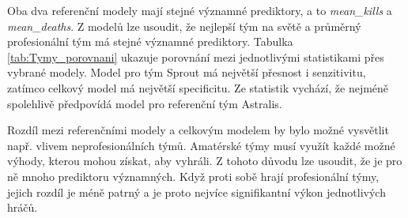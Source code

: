 

Oba dva referenční modely mají stejné významné prediktory, a to \textit{mean\_kills} a \textit{mean\_deaths}. Z modelů lze usoudit, že nejlepší tým na světě a průměrný profesionální
tým má stejné významné prediktory. Tabulka \ref{tab:Tymy_porovnani} ukazuje porovnání mezi jednotlivými statistikami přes vybrané modely. Model pro tým Sprout má největší přesnost
i senzitivitu, zatímco celkový model má největší specificitu. Ze statistik vychází, že nejméně spolehlivě předpovídá model pro referenční tým Astralis. 

Rozdíl mezi referenčními modely a celkovým modelem by bylo možné vysvětlit např. vlivem neprofesionálních týmů. Amatérské týmy musí využít každé možné výhody,
kterou mohou získat, aby vyhráli. Z tohoto důvodu lze usoudit, že je pro ně mnoho prediktoru významných. Když proti sobě hrají profesionální týmy, jejich rozdíl je
méně patrný a je proto nejvíce signifikantní výkon jednotlivých hráčů.